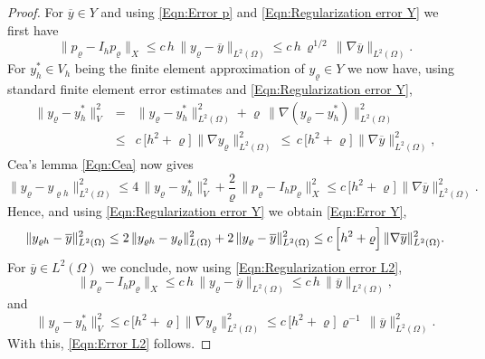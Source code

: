 \documentclass{article}
\numberwithin{equation}{section}
\begin{document}
\begin{proof}
  For $\overline{y} \in Y$ and using \eqref{Eqn:Error p} and
  \eqref{Eqn:Regularization error Y} we first have
  \[
    \| p_\varrho - I_h p_\varrho \|_X \leq
    c \, h \, \| y_\varrho - \overline{y} \|_{L^2(\Omega)} \leq
    c \, h \, \varrho^{1/2} \, \| \nabla \overline{y} \|_{L^2(\Omega)} .
  \]
  For $y_h^* \in V_h$ being the finite element approximation of
  $y_\varrho \in Y$ we now have, using standard finite element error
  estimates and \eqref{Eqn:Regularization error Y},
  \begin{eqnarray*}
    \| y_\varrho - y_h^* \|_V^2
    & = & \| y_\varrho - y_h^* \|_{L^2(\Omega)}^2 + \varrho \,
          \| \nabla (y_\varrho - y_h^*) \|^2_{L^2(\Omega)} \\
    & \leq & c \, \Big[ h^2 + \varrho \Big] \,
             \| \nabla y_\varrho \|^2_{L^2(\Omega)} \, \leq \,
             c \, \Big[ h^2 + \varrho \Big] \,
             \| \nabla \overline{y} \|^2_{L^2(\Omega)},
  \end{eqnarray*}
  Cea's lemma \eqref{Eqn:Cea} now gives
  \[
    \| y_\varrho - y_{\varrho h} \|^2_{L^2(\Omega)}
    \leq 4 \, \| y_\varrho - y_h^* \|_V^2 + \frac{2}{\varrho} \,
    \| p_\varrho - I_h p_\varrho \|_X^2 \leq
    c \, \Big[ h^2 + \varrho \Big] \,
    \| \nabla \overline{y} \|^2_{L^2(\Omega)} .
  \]
  Hence, and using \eqref{Eqn:Regularization error Y} we
  obtain \eqref{Eqn:Error Y},
  \[
    \| y_{\varrho h} - \overline{y} \|_{L^2(\Omega)}^2
    \leq 2 \, \| y_{\varrho h} - y_\varrho \|^2_{L(\Omega)} +
    2 \, \| y_\varrho - \overline{y} \|^2_{L^2(\Omega)} \\
    \leq c \, \Big[ h^2 + \varrho \Big] \,
    \| \nabla \overline{y} \|^2_{L^2(\Omega)} .
  \]
  For $\overline{y} \in L^2(\Omega)$ we conclude,
  now using \eqref{Eqn:Regularization error L2},
   \[
    \| p_\varrho - I_h p_\varrho \|_X \leq
    c \, h \, \| y_\varrho - \overline{y} \|_{L^2(\Omega)} \leq
    c \, h \, \| \overline{y} \|_{L^2(\Omega)} ,
  \]
  and
  \[
    \| y_\varrho - y_h^* \|_V^2 \leq c \, \Big[ h^2 + \varrho \Big] \,
    \| \nabla y_\varrho \|^2_{L^2(\Omega)}
    \leq c \, \Big[ h^2 + \varrho \Big] \, \varrho^{-1} \,
    \| \overline{y} \|^2_{L^2(\Omega)} .
  \]
  With this, \eqref{Eqn:Error L2} follows.
\end{proof}


%
%
\end{document}
